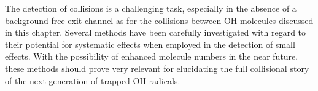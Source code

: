 The detection of collisions is a challenging task, especially in the absence of a background-free exit channel as for the collisions between OH molecules discussed in this chapter.
Several methods have been carefully investigated with regard to their potential for systematic effects when employed in the detection of small effects.
With the possibility of enhanced molecule numbers in the near future, these methods should prove very relevant for elucidating the full collisional story of the next generation of trapped OH radicals.


\ifx\justbeingincluded\undefined

\fi
